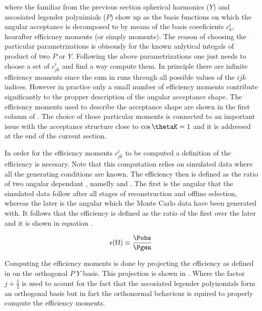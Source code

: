 \noindent where the familiar from the previous section spherical harmonics ($Y$) and ascosiated legender polynimials ($P$) show up as the basis
functions on which the angular acceptance is decomposed to by means of the basis coeeficients $c^i_{k}$, hearafter efficicney moments (or simply moments). 
The reason of choosing the particular parametrizations is obisously for the known anlytical integals of product of two $P$ or $Y$. 
Following the above parametrizations one just needs to choose a set of $c^i_{jk}$ and find a way compute them. In principle there are infinite efficiency moments
since the sum in  runs through all possible values of the $ijk$ indices. However in practice only a small number of efficiency moments 
contribute significantly to the propper description of the angular acceptance shape. The efficiency moments used to describe the acceptance 
shape are shown in the first column of . The choice of those particular moments is connected to an important issue with the acceptance 
structure close to $\cos\thetaK=1$ and it is addressed at the end of the current section.   

In order for the efficiency moments $c^i_{jk}$ to be computed a definition of the efficiency is necesary. Note that this computation relies on 
simulated data where all the generating conditions are known. The efficiency then is defined as the ratio of two angular dependant \pdfs, namelly
\Pobs and \Pgen. The first is the angular \pdf that the simulated data follow after all stages of reconstruction and offline selection, whereas
the later is the angular \pdf which the Monte Carlo data have been generated with. It follows that the efficiency is defined as the ratio of the first
over the later and it is shown in equation .

\begin{center}
\begin{equation}
  \epsilon(\Omega) \equiv \frac{\Pobs}{\Pgen}
  \label{eff_def}
\end{equation}
\end{center}

\noindent Computing the efficiency moments is done by projecting the efficiency as defined in  on the orthogonal $P\;Y$ basis.
This projection is shown in . Where the factor $j+\frac{1}{2}$ is used to acount for the fact that the ascosiated legender 
polynomials form an orthogonal basis but in fact the orthonormal behaviour is rquired to properly compute the efficiency moments. 


